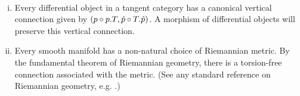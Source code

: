 \begin{example}
    ~\begin{enumerate}[(i)]
        \item Every differential object in a tangent category has a canonical vertical connection given by $(p \circ p.T, \hat{p} \circ T.\hat{p})$. A morphism of differential objects will preserve this vertical connection.
        \item Every smooth manifold has a non-natural choice of Riemannian metric. By the fundamental theorem of Riemannian geometry, there is a torsion-free connection associated with the metric. (See any standard reference on Riemannian geometry, e.g. \cite{Carmo1992}.)
    
    

\end{enumerate}
\end{example}
